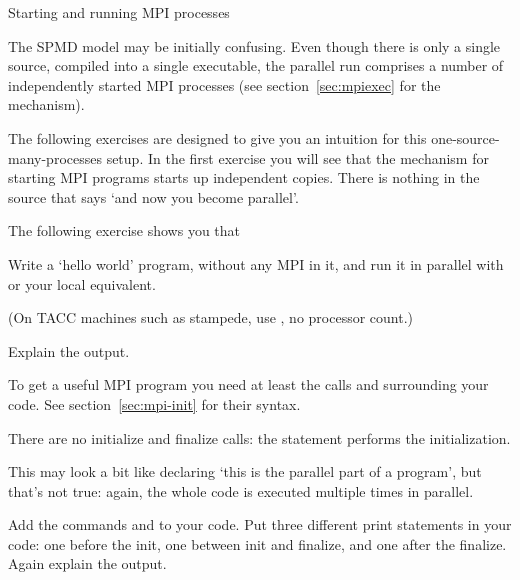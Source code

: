 
 {Starting and running MPI processes}
\label{sec:mpi-init}

The \ac{SPMD} model may be initially confusing. Even though there is
only a single source, compiled into a single executable,
the parallel run comprises a number of independently started MPI
processes (see section~\ref{sec:mpiexec} for the mechanism).

The following exercises are designed to give you an intuition for this
one-source-many-processes setup. In the first exercise you will see
that the mechanism for starting MPI programs starts up independent
copies. There is nothing in the source that says `and now you become parallel'.

The following exercise shows you that 
\begin{exercise}
  \label{ex:hello1}
  Write a `hello world' program, without any MPI in it,
  and run it in parallel with  or your local equivalent. 

\begin{tacc}
    (On TACC machines such as stampede, use , no
    processor count.)
\end{tacc}

  Explain the output.
\end{exercise}

To get a useful MPI program you need at least the calls 
and  surrounding your code. See section~\ref{sec:mpi-init} for their syntax.
\begin{pythonnote}
  There are no initialize and finalize calls: the  statement
  performs the initialization.
\end{pythonnote}

This may look a bit like declaring `this is the parallel part of a
program', but that's not true: again, the whole code is executed
multiple times in parallel.

\begin{exercise}
  \label{ex:hello2}
  Add the commands  and 
  to your code. Put three different print statements in your code: one before the init,
  one between init and finalize, and one after the finalize. Again explain the output.
\end{exercise}

